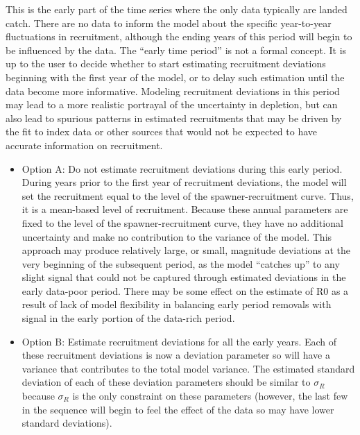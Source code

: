 This is the early part of the time series where the only data typically are landed catch.  There are no data to inform the model about the specific year-to-year fluctuations in recruitment, although the ending years of this period will begin to be influenced by the data.  The “early time period” is not a formal concept. 	It is up to the user to decide whether to start estimating recruitment deviations beginning with the first year of the model, or to delay such estimation until the data become more informative. Modeling recruitment deviations in this period may lead to a more realistic portrayal of the uncertainty in depletion, but can also lead to spurious patterns in estimated recruitments that may be driven by the fit to index data or other sources that would not be expected to have accurate information on recruitment.
	\begin{itemize}
		\item Option A: Do not estimate recruitment deviations during this early period.  During years prior to the first year of recruitment deviations, the model will set the recruitment equal to the level of the spawner-recruitment curve.  Thus, it is a mean-based level of recruitment.  Because these annual parameters are fixed to the level of the spawner-recruitment curve, they have no additional uncertainty and make no contribution to the variance of the model. This approach may produce relatively large, or small, magnitude deviations at the very beginning of the subsequent period, as the model “catches up” to any slight signal that could not be captured through estimated deviations in the early data-poor period.  There may be some effect on the estimate of R0 as a result of lack of model flexibility in balancing early period removals with signal in the early portion of the data-rich period.  
		\item Option B: Estimate recruitment deviations for all the early years.  Each of these recruitment deviations is now a deviation parameter so will have a variance that contributes to the total model variance.  The estimated standard deviation of each of these deviation parameters should be similar to $\sigma_R$ because $\sigma_R$ is the only constraint on these parameters (however, the last few in the sequence will begin to feel the effect of the data so may have lower standard deviations). 		
	\end{itemize}
	
